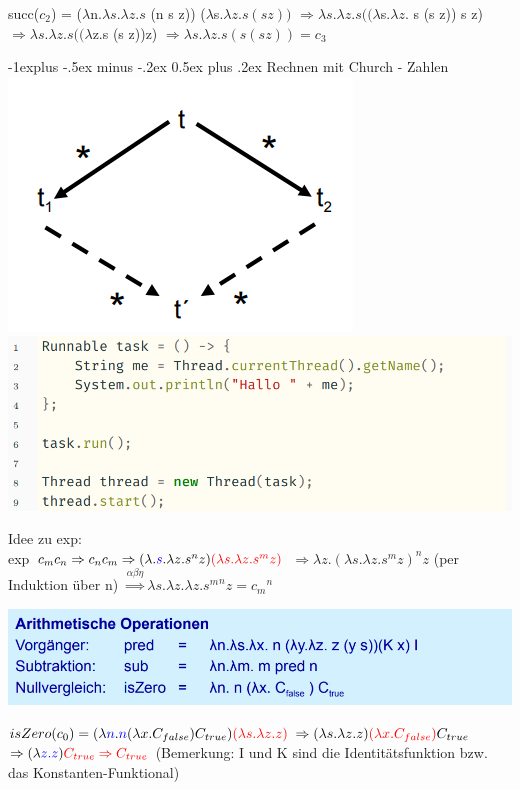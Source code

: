 \documentclass[10pt]{article}
\makeatletter
\renewcommand{\subsection}{\@startsection{subsection}{2}{0mm}%
                                {-1explus -.5ex minus -.2ex}%
                                {0.5ex plus .2ex}%
                                {\normalfont\normalsize\bfseries}}
\makeatother
\begin{document}
succ($c_2$) = ($\lambda$\color{blue}n\color{black}.$\lambda s.\lambda z.s$ (\color{blue}n\color{black} s z)) \color{red} ($\lambda$s.$\lambda z.s (s z))$ \color{black}
\subitem $\Rightarrow\lambda s.\lambda z.s ((\lambda$\color{blue}s\color{black}.$\lambda z.$ \color{blue} s \color{black}(\color{blue}s\color{black} z)) s z)
\subitem $\Rightarrow\lambda s.\lambda z.s((\lambda$\color{blue}z\color{black}.s (s \color{blue}z\color{black}))\color{red}z\color{black})
\subitem $\Rightarrow\lambda s.\lambda z.s(s(s z)) = c_3$

\subsection{Rechnen mit Church - Zahlen }
\includegraphics[width=0.4\linewidth]{Assets/Programmierparadigmen-diamant-eigenschaft}
\includegraphics[width=0.4\linewidth]{Assets/Programmierparadigmen-code-snippet-01.png}

Idee zu exp: \\
\subitem exp $c_m c_n \Rightarrow c_n c_m \Rightarrow (\lambda.\color{blue}s\color{black}.\lambda z.s^n z)\color{red}(\lambda s. \lambda z.s^m z)$ \color{black}
\subsubitem $\Rightarrow \lambda z.(\lambda s. \lambda z.s^m z)^n z$
\subitem (per Induktion über n) $\stackrel{\alpha \beta \eta}{\Rightarrow}\lambda s.\lambda z. \lambda z.{s^m}^n z = {c_m}^n$

\begin{center}
  \includegraphics[width=0.4\linewidth]{Assets/Programmierparadigmen-Arithmetische-Operationen}
\end{center}

\subitem $isZero(c_0) = (\lambda\color{blue}n\color{black}.\color{blue}n\color{black}(\lambda x.C_{false})C_{true})\color{red} (\lambda s.\lambda z.z)\color{black}$
\subsubitem $\Rightarrow (\lambda s. \lambda z. z)\color{red} (\lambda x.C_{false})\color{black} C_{true}$
\subsubitem $\Rightarrow (\lambda \color{blue} z.z \color{black}) \color{red} C_{true} \Rightarrow C_{true}$
(Bemerkung: I und K sind die Identitätsfunktion bzw. das Konstanten-Funktional)
\end{document}
